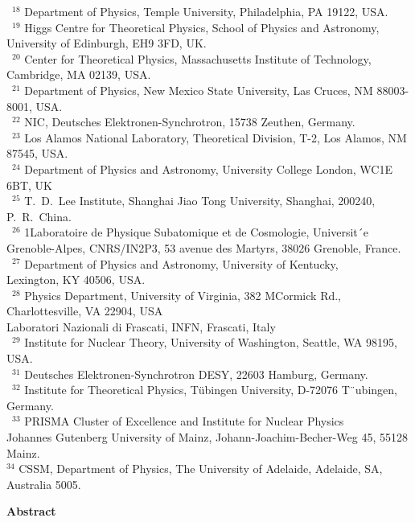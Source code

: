 \documentclass[twoside,12pt]{article}
\numberwithin{equation}{section}
\numberwithin{figure}{section}
\numberwithin{table}{section}
\begin{document}
\begin{center}
{~$^{18}$ Department of Physics, Temple University, Philadelphia, PA 19122, USA. \\
~$^{19}$ Higgs Centre for Theoretical Physics, School of
Physics and Astronomy,\\ University of Edinburgh, EH9 3FD, UK. \\
~$^{20}$ Center for Theoretical Physics, Massachusetts Institute of Technology, Cambridge, MA 02139, USA. \\
~$^{21}$ Department of Physics, New Mexico State University, Las Cruces, NM 88003-8001, USA. \\
~$^{22}$ NIC, Deutsches Elektronen-Synchrotron, 15738 Zeuthen, Germany.\\
~$^{23}$ Los Alamos National Laboratory, Theoretical Division, T-2, Los Alamos, NM 87545, USA. \\
~$^{24}$ Department of Physics and Astronomy, University College London, WC1E 6BT, UK \\
~$^{25}$ T.~D.~Lee Institute, Shanghai Jiao Tong University, Shanghai, 200240, P.~R.~China. \\
~$^{26}$ 1Laboratoire de Physique Subatomique et de Cosmologie, Universit´e Grenoble-Alpes, CNRS/IN2P3, 53 avenue des Martyrs,
38026 Grenoble, France. \\
~$^{27}$ Department of Physics and Astronomy, University of Kentucky, \\
Lexington, KY 40506, USA. \\
~$^{28}$ Physics Department, University of Virginia, 382 MCormick Rd.,
Charlottesville, VA 22904, USA \\
Laboratori Nazionali di Frascati, INFN, Frascati, Italy \\
~$^{29}$ Institute for Nuclear Theory, University of Washington, Seattle, WA 98195, USA. \\
~$^{31}$ Deutsches Elektronen-Synchrotron DESY, 22603 Hamburg, Germany. \\
~$^{32}$ Institute for Theoretical Physics, T\"ubingen University, D-72076 T¨ubingen, Germany. \\
~$^{33}$ PRISMA Cluster of Excellence and Institute for Nuclear Physics \\
Johannes Gutenberg University of Mainz, Johann-Joachim-Becher-Weg 45,
55128 Mainz.\\
$^{34}$ CSSM, Department of Physics, The University of Adelaide, Adelaide, SA, Australia 5005.\\
}

\clearpage

{\bf \large Abstract}


\end{center}
\end{document}
